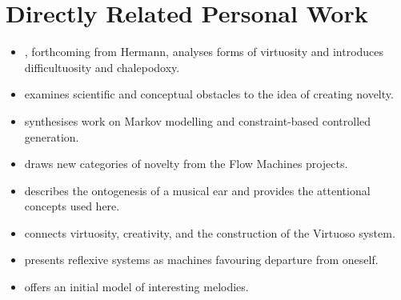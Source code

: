 \documentclass[11pt,a4paper]{article}
\begin{document}
\section{Directly Related Personal Work}

\begin{itemize}
  \item \textcite{pachet2027virtuosite}, forthcoming from Hermann, analyses
        forms of virtuosity and introduces difficultuosity and chalepodoxy.
  \item \textcite{pachet2026impossibilite} examines scientific and conceptual
        obstacles to the idea of creating novelty.
  \item \textcite{pachet2026markov} synthesises work on Markov modelling and
        constraint-based controlled generation.
  \item \textcite{pachet2021assisted} draws new categories of novelty from the
        Flow Machines projects.
  \item \textcite{pachet2018oreille} describes the ontogenesis of a musical ear
        and provides the attentional concepts used here.
  \item \textcite{pachet2012virtuosity} connects virtuosity, creativity, and the
        construction of the Virtuoso system.
  \item \textcite{pachet2008machines} presents reflexive systems as machines
        favouring departure from oneself.
  \item \textcite{pachet2006clefs} offers an initial model of interesting
        melodies.
\end{itemize}

\printbibliography[title={References}]
\end{document}
